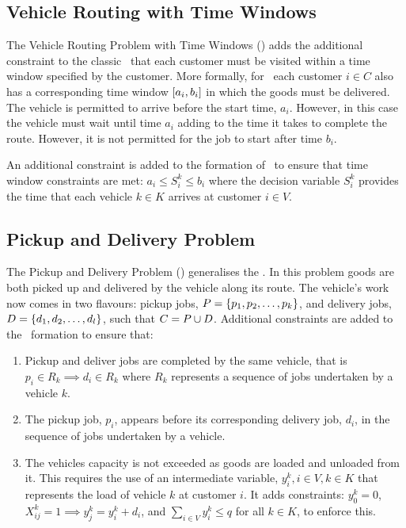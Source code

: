 \subsection{Vehicle Routing with Time Windows}

The Vehicle Routing Problem with Time Windows (\VRPTW) adds the additional constraint to the classic \VRP\ that each customer must be visited within a time window specified by the customer. More formally, for \VRPTW\ each customer $i \in C$ also has a corresponding time window $[a_i, b_i]$ in which the goods must be delivered. The vehicle is permitted to arrive before the start time, $a_i$. However, in this case the vehicle must wait until time $a_i$ adding to the time it takes to complete the route. However, it is not permitted for the job to start after time $b_i$.

An additional constraint is added to the formation of \CVRP\ to ensure that time window constraints are met: $a_i \leq S_i^k \leq b_i$ where the decision variable $S_i^k$ provides the time that each vehicle $k \in K$ arrives at customer $i \in V$.

\subsection{Pickup and Delivery Problem}

The Pickup and Delivery Problem (\PDP) generalises the \VRP. In this problem goods are both picked up and delivered by the vehicle along its route. The vehicle's work now comes in two flavours: pickup jobs, $P = \{p_1,p_2,\ldots,p_k\}$, and delivery jobs, $D = \{d_1,d_2,\ldots,d_l\}$, such that $C = P \cup D$. Additional constraints are added to the \CVRP\ formation to ensure that:

\begin{enumerate}
   \item Pickup and deliver jobs are completed by the same vehicle, that is $p_i \in R_k \implies d_i \in R_k$ where $R_k$ represents a sequence of jobs undertaken by a vehicle $k$.

   \item The pickup job, $p_i$, appears before its corresponding delivery job, $d_i$, in the sequence of jobs undertaken by a vehicle.

   \item The vehicles capacity is not exceeded as goods are loaded and unloaded from it. This requires the use of an intermediate variable, $y^k_i, i \in V, k \in K$ that represents the load of vehicle $k$ at customer $i$. It adds constraints: $y^k_0 = 0$, $X_{ij}^k = 1 \implies y^k_j = y^k_i + d_i$, and $\sum_{i \in V} y^k_i \leq q$ for all $k \in K$, to enforce this.
   
\end{enumerate}

